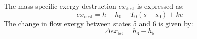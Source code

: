 The mass-specific exergy destruction \( ex_{\text{dest}} \) is expressed as:  
\[
ex_{\text{dest}} = h - h_0 - T_0(s - s_0) + ke
\]  
The change in flow exergy between states 5 and 6 is given by:  
\[
\Delta ex_{56} = h_6 - h_5
\]